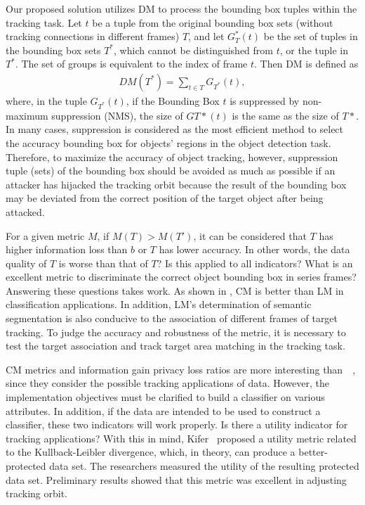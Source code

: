\documentclass[trans]{IEEEtran}
\newcommand{\el}[1]{{\color{black}#1}}
\begin{document}
Our proposed solution utilizes DM to process the bounding box tuples within the tracking task. \el{ Let $t$ be a tuple from the original bounding box sets (without tracking connections in different frames) $T$, and let $G_T^*(t)$ be the set of tuples in the bounding box sets $ T^* $, which cannot be distinguished from $t$, or the tuple in $T^*$. The set of groups is equivalent to the index of frame $t$. Then DM is defined as
\begin{eqnarray}\label{DMformula}
DM(T^*)=\sum_{t \in T} G_{T^*} (t),
\end{eqnarray}
where, in the tuple $G_{T^*} (t)$,} if the Bounding Box $t$ is suppressed by non-maximum suppression (NMS), the size of $GT*(t)$ is the same as the size of $T*$. In many cases, suppression is considered as the most efficient method to select the accuracy bounding box for objects' regions in the object detection task. Therefore, to maximize the accuracy of object tracking, however, suppression tuple (sets) of the bounding box should be avoided as much as possible if an attacker has hijacked the tracking orbit because the result of the bounding box may \el{ be deviated} from the correct position of the target object after being attacked.

For a given metric $M$, if $M(T)>M(T')$, it can be considered that $T$ has higher information loss than $b$ or $T$ has lower accuracy. In other words, the data quality of \el{ $T$ is worse than that of $T$? Is this applied to all indicators? What is an excellent metric to discriminate the correct object bounding box in series frames? Answering these questions takes work. As shown in \cite{nergiz2007thoughts},} CM is better than LM in classification applications. In addition, LM's determination of semantic segmentation is also conducive to the association of different frames of target tracking. To judge the accuracy and robustness of the metric, it is necessary to test the target association and track target area matching in the tracking task.

CM metrics and information gain privacy loss ratios are more interesting than~\cite{bertino2005information}~\cite{sweeney2002achieving},  \el{ since  they consider the possible tracking applications of data. However, the implementation objectives must be clarified to build a classifier on various attributes. In addition, if the data are intended to be used to construct a classifier, these two indicators will work properly.} Is there a utility indicator for tracking applications? With this in mind, Kifer~\cite{kifer2006injecting} proposed a utility metric related to the Kullback-Leibler divergence, \el{ which, in theory,  can produce a better-protected data set. The researchers measured the utility of the resulting protected data set. Preliminary results showed that this metric was excellent in adjusting tracking orbit.}
\end{document}
